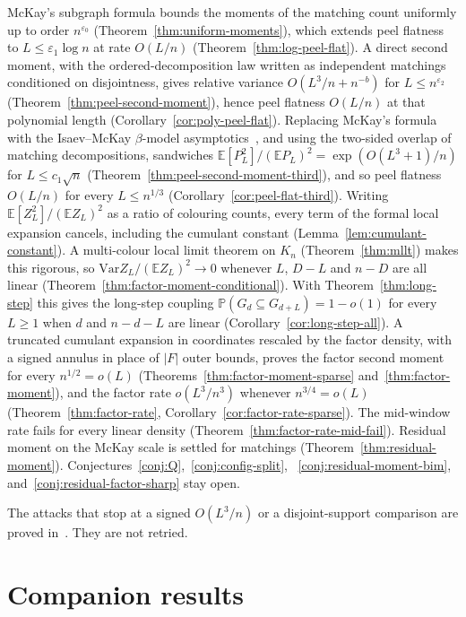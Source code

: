 \documentclass[11pt]{article}
\newcommand{\EE}{\mathbb{E}}
\newcommand{\PP}{\mathbb{P}}
\newcommand{\Var}{\mathrm{Var}}
\begin{document}
McKay's subgraph formula bounds the moments of the matching count uniformly
up to order \(n^{\varepsilon_0}\) (Theorem~\ref{thm:uniform-moments}), which
extends peel flatness to \(L\le\varepsilon_1\log n\) at rate \(O(L/n)\)
(Theorem~\ref{thm:log-peel-flat}).
A direct second moment, with the ordered-decomposition law written as
independent matchings conditioned on disjointness, gives relative variance
\(O(L^3/n+n^{-b})\) for \(L\le n^{\varepsilon_2}\)
(Theorem~\ref{thm:peel-second-moment}), hence peel flatness \(O(L/n)\) at that
polynomial length (Corollary~\ref{cor:poly-peel-flat}).
Replacing McKay's formula with the Isaev--McKay \(\beta\)-model
asymptotics~\cite{IM25}, and using the two-sided overlap of matching
decompositions, sandwiches
\(\EE[P_L^2]/(\EE P_L)^2=\exp(O(L^3+1)/n)\) for \(L\le c_1\sqrt n\)
(Theorem~\ref{thm:peel-second-moment-third}), and so peel flatness
\(O(L/n)\) for every \(L\le n^{1/3}\) (Corollary~\ref{cor:peel-flat-third}).
Writing \(\EE[Z_L^2]/(\EE Z_L)^2\) as a ratio of colouring counts, every term of
the formal local expansion cancels, including the cumulant constant
(Lemma~\ref{lem:cumulant-constant}). A multi-colour local limit theorem on
\(K_n\) (Theorem~\ref{thm:mllt}) makes this rigorous, so
\(\Var Z_L/(\EE Z_L)^2\to0\) whenever \(L\), \(D-L\) and \(n-D\) are all linear
(Theorem~\ref{thm:factor-moment-conditional}).
With Theorem~\ref{thm:long-step} this gives the long-step coupling
\(\PP(G_d\subseteq G_{d+L})=1-o(1)\) for every \(L\ge1\) when \(d\) and
\(n-d-L\) are linear (Corollary~\ref{cor:long-step-all}).
A truncated cumulant expansion in coordinates rescaled by the factor density,
with a signed annulus in place of \(|F|\) outer bounds, proves the factor
second moment for every \(n^{1/2}=o(L)\)
(Theorems~\ref{thm:factor-moment-sparse} and~\ref{thm:factor-moment}), and the
factor rate \(o(L^3/n^3)\) whenever \(n^{3/4}=o(L)\)
(Theorem~\ref{thm:factor-rate}, Corollary~\ref{cor:factor-rate-sparse}).
The mid-window rate fails for every linear density
(Theorem~\ref{thm:factor-rate-mid-fail}). Residual moment on the McKay scale
is settled for matchings (Theorem~\ref{thm:residual-moment}).
Conjectures~\ref{conj:Q},~\ref{conj:config-split},
~\ref{conj:residual-moment-bim}, and~\ref{conj:residual-factor-sharp}
stay open.

The attacks that stop at a signed \(O(L^3/n)\) or a disjoint-support
comparison are proved in~\cite{PlusOneV1}.
They are not retried.

\section{Companion results}
\end{document}
